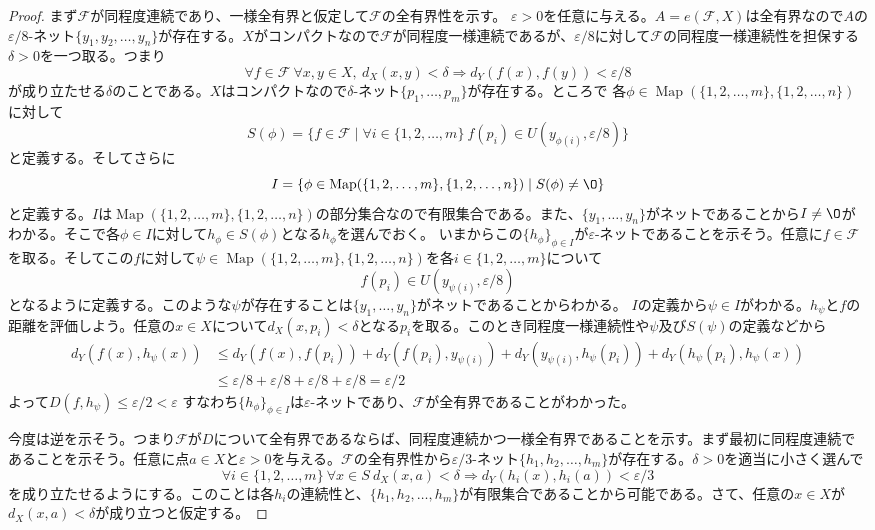 \documentclass[leqno]{jsarticle}
\newcommand{\To}{\Longrightarrow}
\newcommand{\ep}{\varepsilon}
\DeclareMathOperator{\map}{Map}
\begin{document}
\begin{proof}
まず$\mathcal{F}$が同程度連続であり、一様全有界と仮定して$\mathcal{F}$の全有界性を示す。
$\ep>0$を任意に与える。$A=e(\mathcal{F},X)$は全有界なので$A$の$\ep/8$-ネット$\{y_1,y_2,\dots,y_n\}$が存在する。$X$がコンパクトなので$\mathcal{F}$が同程度一様連続であるが、$\ep/8$に対して$\mathcal{F}$の同程度一様連続性を担保する$\delta>0$を一つ取る。つまり
\[
 \forall f\in \mathcal{F}\ \forall x,y\in X,\ d_X(x,y)<\delta\To d_Y(f(x),f(y))<\ep/8
\]
が成り立たせる$\delta$のことである。$X$はコンパクトなので$\delta$-ネット$\{p_1,\dots,p_m\}$が存在する。ところで
各$\phi\in \map(\{1,2,\dots, m\}, \{1,2,\dots, n\})$に対して
\[
S(\phi)=\{f\in \mathcal{F}\mid \forall i\in \{1,2,\dots, m\}\ f(p_i)\in U(y_{\phi(i)}, \ep/8)\}
\]
と定義する。そしてさらに
\[
I=\{\phi\in \map(\{1,2,\dots, m\}, \{1,2,\dots, n\})\mid S(\phi)\neq \O\}
\]
と定義する。$I$は$\map(\{1,2,\dots, m\}, \{1,2,\dots, n\})$の部分集合なので有限集合である。また、$\{y_1,\dots,y_n\}$がネットであることから$I\neq \O$がわかる。そこで各$\phi\in I$に対して$h_{\phi}\in S(\phi)$となる$h_{\phi}$を選んでおく。
いまからこの$\{h_{\phi}\}_{\phi\in I}$が$\ep$-ネットであることを示そう。任意に$f\in \mathcal{F}$を取る。そしてこの$f$に対して$\psi\in \map(\{1,2,\dots, m\}, \{1,2,\dots, n\})$を各$i\in \{1,2,\dots, m\}$について
\[
f(p_i)\in U(y_{\psi(i)},\ep/8)
\]
となるように定義する。このような$\psi$が存在することは$\{y_1,\dots,y_n\}$がネットであることからわかる。
$I$の定義から$\psi\in I$がわかる。$h_{\psi}$と$f$の距離を評価しよう。任意の$x\in X$について$d_X(x,p_i)<\delta$となる$p_i$を取る。このとき同程度一様連続性や$\psi$及び$S(\psi)$の定義などから
\begin{align*}
d_Y(f(x),h_{\psi}(x))&\le d_Y(f(x),f(p_i))+d_Y(f(p_i),y_{\psi(i)})+d_Y(y_{\psi(i)}, h_{\psi}(p_i))+d_Y(h_{\psi}(p_i),h_{\psi}(x))\\
&\le \ep/8+\ep/8+\ep/8+\ep/8=\ep/2
\end{align*}
よって$D(f,h_{\psi})\le \ep/2<\ep$
すなわち$\{h_{\phi}\}_{\phi\in I}$は$\ep$-ネットであり、$\mathcal{F}$が全有界であることがわかった。
\par
今度は逆を示そう。つまり$\mathcal{F}$が$D$について全有界であるならば、同程度連続かつ一様全有界であることを示す。まず最初に同程度連続であることを示そう。任意に点$a\in X$と$\ep>0$を与える。$\mathcal{F}$の全有界性から$\ep/3$-ネット$\{h_1,h_2,\dots, h_m\}$が存在する。$\delta>0$を適当に小さく選んで
\[
\forall i\in \{1,2,\dots, m\}\  \forall x\in  S\ d_X(x,a)<\delta\To d_Y(h_i(x),h_i(a))<\ep/3
\]
を成り立たせるようにする。このことは各$h_i$の連続性と、$\{h_1,h_2,\dots, h_m\}$が有限集合であることから可能である。さて、任意の$x\in X$が$d_X(x,a)<\delta$が成り立つと仮定する。

\end{proof}
\end{document}
